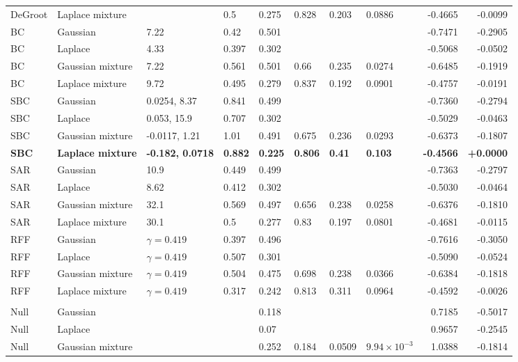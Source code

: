 \begin{longtable}{llllllllrr}
DeGroot & Laplace mixture &  & 0.5 & 0.275 & 0.828 & 0.203 & 0.0886 & -0.4665 & -0.0099 \\
BC & Gaussian & 7.22 & 0.42 & 0.501 &  &  &  & -0.7471 & -0.2905 \\
BC & Laplace & 4.33 & 0.397 & 0.302 &  &  &  & -0.5068 & -0.0502 \\
BC & Gaussian mixture & 7.22 & 0.561 & 0.501 & 0.66 & 0.235 & 0.0274 & -0.6485 & -0.1919 \\
BC & Laplace mixture & 9.72 & 0.495 & 0.279 & 0.837 & 0.192 & 0.0901 & -0.4757 & -0.0191 \\
SBC & Gaussian & 0.0254, 8.37 & 0.841 & 0.499 &  &  &  & -0.7360 & -0.2794 \\
SBC & Laplace & 0.053, 15.9 & 0.707 & 0.302 &  &  &  & -0.5029 & -0.0463 \\
SBC & Gaussian mixture & -0.0117, 1.21 & 1.01 & 0.491 & 0.675 & 0.236 & 0.0293 & -0.6373 & -0.1807 \\
\textbf{SBC} & \textbf{Laplace mixture} & \textbf{-0.182, 0.0718} & \textbf{0.882} & \textbf{0.225} & \textbf{0.806} & \textbf{0.41} & \textbf{0.103} & \textbf{-0.4566} & \textbf{+0.0000} \\
SAR & Gaussian & 10.9 & 0.449 & 0.499 &  &  &  & -0.7363 & -0.2797 \\
SAR & Laplace & 8.62 & 0.412 & 0.302 &  &  &  & -0.5030 & -0.0464 \\
SAR & Gaussian mixture & 32.1 & 0.569 & 0.497 & 0.656 & 0.238 & 0.0258 & -0.6376 & -0.1810 \\
SAR & Laplace mixture & 30.1 & 0.5 & 0.277 & 0.83 & 0.197 & 0.0801 & -0.4681 & -0.0115 \\
RFF & Gaussian & $\gamma=0.419$ & 0.397 & 0.496 &  &  &  & -0.7616 & -0.3050 \\
RFF & Laplace & $\gamma=0.419$ & 0.507 & 0.301 &  &  &  & -0.5090 & -0.0524 \\
RFF & Gaussian mixture & $\gamma=0.419$ & 0.504 & 0.475 & 0.698 & 0.238 & 0.0366 & -0.6384 & -0.1818 \\
RFF & Laplace mixture & $\gamma=0.419$ & 0.317 & 0.242 & 0.813 & 0.311 & 0.0964 & -0.4592 & -0.0026 \\
\midrule
\multicolumn{10}{l}{\vkg{}} \\
Null & Gaussian &  &  & 0.118 &  &  &  & 0.7185 & -0.5017 \\
Null & Laplace &  &  & 0.07 &  &  &  & 0.9657 & -0.2545 \\
Null & Gaussian mixture &  &  & 0.252 & 0.184 & 0.0509 & $9.94\times10^{-3}$ & 1.0388 & -0.1814 \\

\end{longtable}
